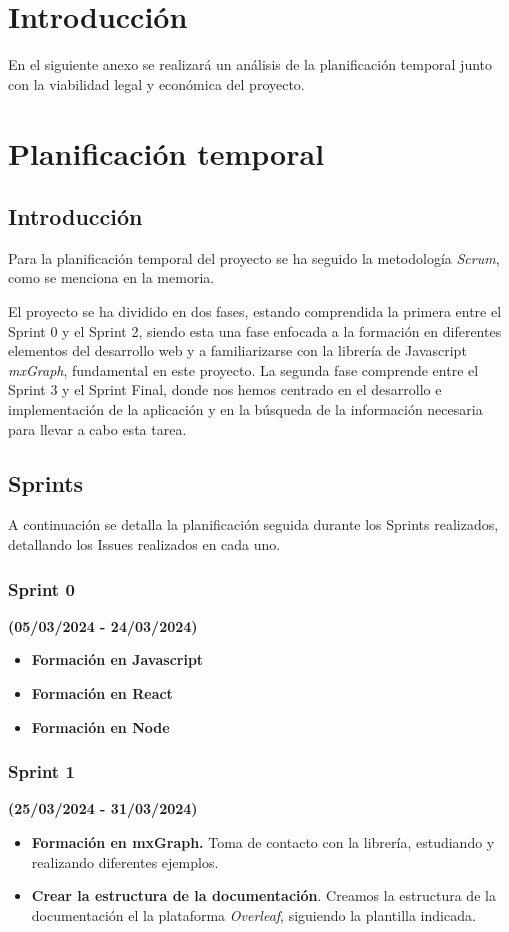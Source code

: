 
\section{Introducción}
En el siguiente anexo se realizará un análisis de la planificación temporal junto con la viabilidad legal y económica del proyecto.

\section{Planificación temporal}
\subsection{Introducción}
Para la planificación temporal del proyecto se ha seguido la metodología \emph{Scrum}, como se menciona en la memoria.

El proyecto se ha dividido en dos fases, estando comprendida la primera entre el Sprint 0 y el Sprint 2, siendo esta una fase enfocada a la formación en diferentes elementos del desarrollo web y a familiarizarse con la librería de Javascript \emph{mxGraph}, fundamental en este proyecto. La segunda fase comprende entre el Sprint 3 y el Sprint Final, donde nos hemos centrado en el desarrollo e implementación de la aplicación y en la búsqueda de la información necesaria para llevar a cabo esta tarea.

\subsection{Sprints}
A continuación se detalla la planificación seguida durante los Sprints realizados, detallando los Issues realizados en cada uno.

\subsubsection{Sprint 0}
\textbf{(05/03/2024 - 24/03/2024)}
\begin{itemize}
    \item \textbf{Formación en Javascript}
    \item \textbf{Formación en React}
    \item \textbf{Formación en Node}
\end{itemize}

\subsubsection{Sprint 1}
\textbf{(25/03/2024 - 31/03/2024)}
\begin{itemize}
    \item \textbf{Formación en mxGraph.} Toma de contacto con la librería, estudiando y realizando diferentes ejemplos.
    \item \textbf{Crear la estructura de la documentación}. Creamos la estructura de la documentación el la plataforma \emph{Overleaf}, siguiendo la plantilla indicada.
\end{itemize}

